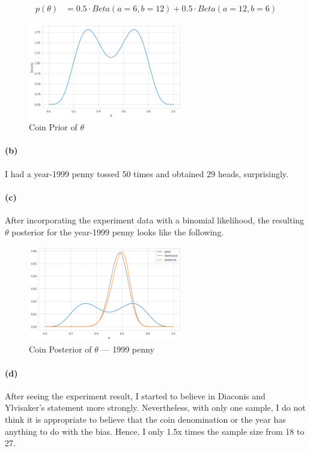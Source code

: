 \documentclass[11pt, letterpaper]{article}
\begin{document}
\begin{align*}
  p(\theta) &= 0.5 \cdot Beta(a=6, b=12) + 0.5 \cdot Beta(a=12, b=6)
\end{align*}
\begin{figure}[!h]
  \centering
  \includegraphics[width=0.6\textwidth]{3.8.a.png}
  \captionsetup{justification=centering}
  \caption{Coin Prior of $\theta$}
\end{figure}

\paragraph{(b)}
I had a year-1999 penny tossed 50 times and obtained 29 heads, surprisingly.

\paragraph{(c)}
After incorporating the experiment data with a binomial likelihood, the resulting $\theta$ posterior for the year-1999
penny looks like the following.

\begin{figure}[!h]
  \centering
  \includegraphics[width=0.6\textwidth]{3.8.c.png}
  \captionsetup{justification=centering}
  \caption{Coin Posterior of $\theta$ --- 1999 penny}
\end{figure}

\paragraph{(d)}
After seeing the experiment result, I started to believe in Diaconis and Ylvisaker's statement more strongly.
Nevertheless, with only one sample, I do not think it is appropriate to believe that the coin denomination or the
year has anything to do with the bias. Hence, I only 1.5x times the sample size from 18 to 27.
\end{document}
